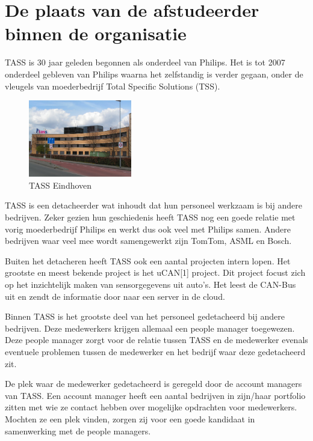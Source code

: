 \documentclass[]{article}
\begin{document}
\newpage
\section{De plaats van de afstudeerder binnen de organisatie}

TASS is 30 jaar geleden begonnen als onderdeel van Philips. Het is tot 2007
onderdeel gebleven van Philips waarna het zelfstandig is verder gegaan,
onder de vleugels van moederbedrijf Total Specific Solutions (TSS).

\begin{figure}
  \begin{center}
    \includegraphics[width=0.40\textwidth]{tass_eindhoven.pdf}
  \end{center}
  \caption{TASS Eindhoven}
\end{figure}

TASS is een detacheerder wat inhoudt dat hun personeel werkzaam is bij
andere bedrijven. Zeker gezien hun geschiedenis heeft TASS nog een goede
relatie met vorig moederbedrijf Philips en werkt dus ook veel met Philips
samen. Andere bedrijven waar veel mee wordt samengewerkt zijn TomTom, ASML
en Bosch.

Buiten het detacheren heeft TASS ook een aantal projecten intern lopen. Het
grootste en meest bekende project is het uCAN[1] project. Dit project
focust zich op het inzichtelijk maken van sensorgegevens uit auto's. Het
leest de CAN-Bus uit en zendt de informatie door naar een server in de
cloud.

Binnen TASS is het grootste deel van het personeel gedetacheerd bij andere
bedrijven. Deze medewerkers krijgen allemaal een people manager toegewezen.
Deze people manager zorgt voor de relatie tussen TASS en de medewerker evenals
eventuele problemen tussen de medewerker en het bedrijf waar deze
gedetacheerd zit.

De plek waar de medewerker gedetacheerd is geregeld door de account
managers van TASS. Een account manager heeft een aantal bedrijven in
zijn/haar portfolio zitten met wie ze contact hebben over mogelijke
opdrachten voor medewerkers. Mochten ze een plek vinden, zorgen zij voor
een goede kandidaat in samenwerking met de people managers.
\end{document}
